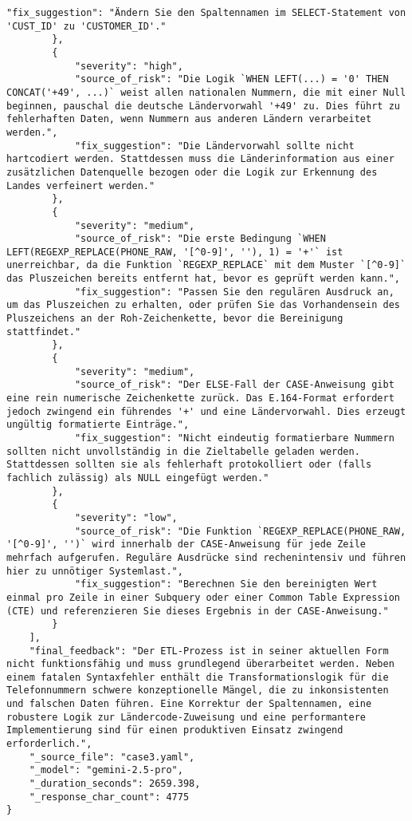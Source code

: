 \begin{lstlisting}[caption={Ausgabe: Gemini 2.5 Pro Anwendungsfall 3 Robustheitsdurchlauf},label={gemini_case3_prompt3}]
            "fix_suggestion": "Ändern Sie den Spaltennamen im SELECT-Statement von 'CUST_ID' zu 'CUSTOMER_ID'."
        },
        {
            "severity": "high",
            "source_of_risk": "Die Logik `WHEN LEFT(...) = '0' THEN CONCAT('+49', ...)` weist allen nationalen Nummern, die mit einer Null beginnen, pauschal die deutsche Ländervorwahl '+49' zu. Dies führt zu fehlerhaften Daten, wenn Nummern aus anderen Ländern verarbeitet werden.",
            "fix_suggestion": "Die Ländervorwahl sollte nicht hartcodiert werden. Stattdessen muss die Länderinformation aus einer zusätzlichen Datenquelle bezogen oder die Logik zur Erkennung des Landes verfeinert werden."
        },
        {
            "severity": "medium",
            "source_of_risk": "Die erste Bedingung `WHEN LEFT(REGEXP_REPLACE(PHONE_RAW, '[^0-9]', ''), 1) = '+'` ist unerreichbar, da die Funktion `REGEXP_REPLACE` mit dem Muster `[^0-9]` das Pluszeichen bereits entfernt hat, bevor es geprüft werden kann.",
            "fix_suggestion": "Passen Sie den regulären Ausdruck an, um das Pluszeichen zu erhalten, oder prüfen Sie das Vorhandensein des Pluszeichens an der Roh-Zeichenkette, bevor die Bereinigung stattfindet."
        },
        {
            "severity": "medium",
            "source_of_risk": "Der ELSE-Fall der CASE-Anweisung gibt eine rein numerische Zeichenkette zurück. Das E.164-Format erfordert jedoch zwingend ein führendes '+' und eine Ländervorwahl. Dies erzeugt ungültig formatierte Einträge.",
            "fix_suggestion": "Nicht eindeutig formatierbare Nummern sollten nicht unvollständig in die Zieltabelle geladen werden. Stattdessen sollten sie als fehlerhaft protokolliert oder (falls fachlich zulässig) als NULL eingefügt werden."
        },
        {
            "severity": "low",
            "source_of_risk": "Die Funktion `REGEXP_REPLACE(PHONE_RAW, '[^0-9]', '')` wird innerhalb der CASE-Anweisung für jede Zeile mehrfach aufgerufen. Reguläre Ausdrücke sind rechenintensiv und führen hier zu unnötiger Systemlast.",
            "fix_suggestion": "Berechnen Sie den bereinigten Wert einmal pro Zeile in einer Subquery oder einer Common Table Expression (CTE) und referenzieren Sie dieses Ergebnis in der CASE-Anweisung."
        }
    ],
    "final_feedback": "Der ETL-Prozess ist in seiner aktuellen Form nicht funktionsfähig und muss grundlegend überarbeitet werden. Neben einem fatalen Syntaxfehler enthält die Transformationslogik für die Telefonnummern schwere konzeptionelle Mängel, die zu inkonsistenten und falschen Daten führen. Eine Korrektur der Spaltennamen, eine robustere Logik zur Ländercode-Zuweisung und eine performantere Implementierung sind für einen produktiven Einsatz zwingend erforderlich.",
    "_source_file": "case3.yaml",
    "_model": "gemini-2.5-pro",
    "_duration_seconds": 2659.398,
    "_response_char_count": 4775
}
\end{lstlisting}

